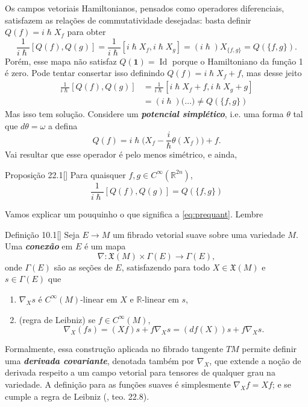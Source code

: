 Os campos vetoriais Hamiltonianos, pensados como operadores diferenciais, satisfazem as relações de commutatividade desejadas: basta definir $Q(f)=i\hslash X_f$ para obter
\[\frac{1}{i\hslash}[Q(f),Q(g)]=\frac{1}{i\hslash}[i\hslash X_f,i\hslash X_g]=(i\hslash) X_{\{f,g\}}=Q(\{f,g\}).\]
Porém, esse mapa não satisfaz $Q(\mathbf{1})=\operatorname{Id}$ porque o Hamiltoniano da função 1 é zero. Pode tentar consertar isso definindo $Q(f)=i\hslash X_f+f$, mas desse jeito
\begin{align*}
	\frac{1}{i\hslash}[Q(f),Q(g)]&=\frac{1}{i\hslash}[i\hslash X_f+f,i\hslash X_g+g]\\
	&=(i\hslash)\Big(\ldots\Big) \neq Q(\{f,g\})
\end{align*}
Mas isso tem solução. Considere um \textit{\textbf{potencial simplético}}, i.e. uma forma  $\theta$ tal que $d\theta=\omega$ a defina
\begin{equation}\label{eq:prequant}
Q(f)=i\hslash \Big(X_f-\frac{i}{\hslash}\theta(X_f)\Big)+f.\end{equation}
Vai resultar que esse operador é pelo menos simétrico, e ainda,
\begin{thing5}{Proposição 22.1}[\cite{hallq}]\label{prop:22.1}\leavevmode
Para quaisquer $f,g\in C^\infty(\mathbb{R}^{2n})$,
\[\frac{1}{i\hslash}[Q(f),Q(g)]=Q(\{f,g\})\]
\end{thing5}
Vamos explicar um pouquinho o que significa a \cref{eq:prequant}. Lembre 
\begin{thing3}{Definição 10.1}[\cite{tu-diff}]\leavevmode
	Seja $E\to M$ um fibrado vetorial suave sobre uma variedade $M$. Uma \textit{\textbf{conexão}} em $E$ é um mapa
	\[\nabla:\mathfrak{X}(M)\times\Gamma(E)\longrightarrow\Gamma(E),\]
onde $\Gamma(E)$ são as seções de $E$, satisfazendo para todo $X\in \mathfrak{X}(M)$ e $s\in\Gamma(E)$ que
\begin{enumerate}[label=(\roman*)]
\item $\nabla_Xs$ é $C^\infty(M)$-linear em $X$ e $\mathbb{R}$-linear em $s$,
\item (regra de Leibniz) se $f\in C^\infty(M)$,
	\[\nabla_X(fs)=(Xf)s+f\nabla_Xs=(df(X))s+f\nabla_Xs.\]
\end{enumerate}
\end{thing3}
Formalmente, essa construção aplicada no fibrado tangente $TM$ permite definir uma \textit{\textbf{derivada covariante}}, denotada também por $\nabla_X$, que extende a noção de derivada respeito a um campo vetorial para tensores de qualquer grau na variedade. A definição para as funções suaves é simplesmente $\nabla_Xf=Xf$; e se cumple a regra de Leibniz (\cite{tu-diff}, teo. 22.8).

